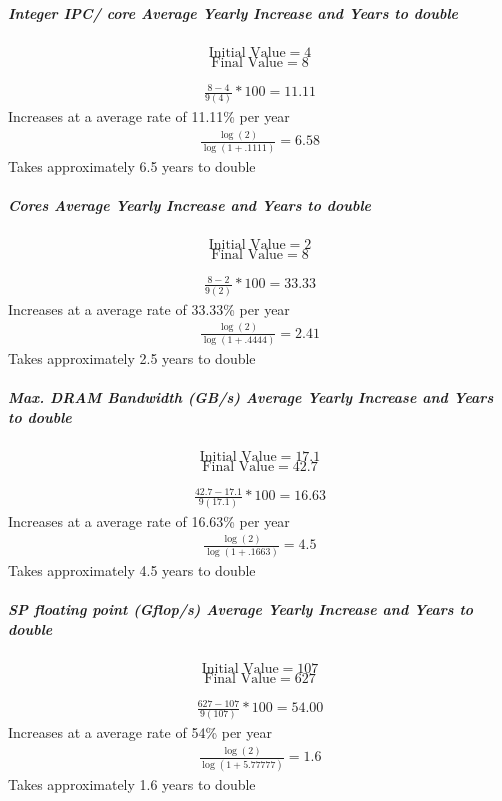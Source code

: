 \documentclass{article}
\begin{document}
    \subparagraph*{Integer IPC/ core Average Yearly Increase and Years to double}
    
    \[ \text{Initial Value} = 4 \]   
    \[ \text{Final Value} = 8 \]    

   \begin{align*}
        \frac{8-4}{9(4)} * 100 = 11.11%
    \end{align*}
    Increases at a average rate of 11.11\% per year
    \begin{align*}
        \frac{\log(2)}{\log(1+.1111)} = 6.58  
    \end{align*}
    Takes approximately 6.5 years to double

    \subparagraph*{Cores Average Yearly Increase and Years to double}
    
    \[ \text{Initial Value} = 2 \]   
    \[ \text{Final Value} = 8 \]    

   \begin{align*}
        \frac{8-2}{9(2)} * 100 = 33.33%
    \end{align*}
    Increases at a average rate of 33.33\% per year
    \begin{align*}
        \frac{\log(2)}{\log(1+.4444)} = 2.41
    \end{align*}
    Takes approximately 2.5 years to double

    \subparagraph*{Max. DRAM Bandwidth (GB/s) Average Yearly Increase and Years to double}
    
    \[ \text{Initial Value} = 17.1 \]   
    \[ \text{Final Value} = 42.7 \]    

   \begin{align*}
        \frac{42.7-17.1}{9(17.1)} * 100 = 16.63%
    \end{align*}
    Increases at a average rate of 16.63\% per year
    \begin{align*}
        \frac{\log(2)}{\log(1+.1663)} = 4.5
    \end{align*}
    Takes approximately 4.5 years to double

    \subparagraph*{SP floating point (Gflop/s) Average Yearly Increase and Years to double}
    
    \[ \text{Initial Value} = 107 \]   
    \[ \text{Final Value} = 627 \]    

   \begin{align*}
        \frac{627-107}{9(107)} * 100 = 54.00%
    \end{align*}
    Increases at a average rate of 54\% per year
    \begin{align*}
        \frac{\log(2)}{\log(1+5.77777)} = 1.6
    \end{align*}
    Takes approximately 1.6 years to double
\end{document}
